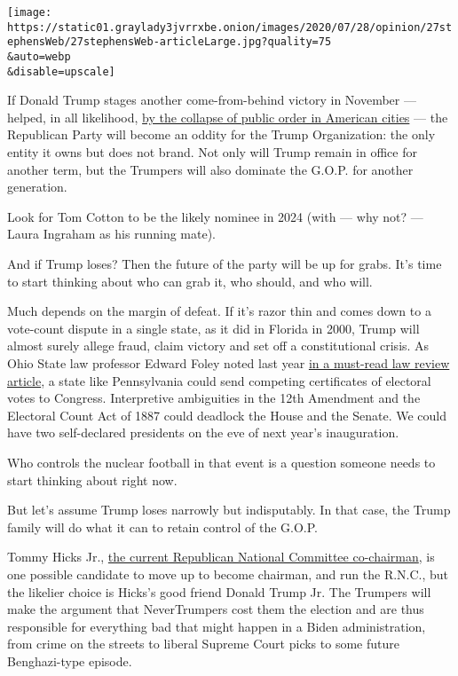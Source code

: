 \texttt{[image: https://static01.graylady3jvrrxbe.onion/images/2020/07/28/opinion/27stephensWeb/27stephensWeb-articleLarge.jpg?quality=75\\\&auto=webp\\\&disable=upscale]}

If Donald Trump stages another come-from-behind victory in November ---
helped, in all likelihood,
\href{https://www.nytimes3xbfgragh.onion/2020/07/26/us/protests-portland-seattle-trump.html?action=click\&module=Top\%20Stories\&pgtype=Homepage}{by
the collapse of public order in American cities} --- the Republican
Party will become an oddity for the Trump Organization: the only entity
it owns but does not brand. Not only will Trump remain in office for
another term, but the Trumpers will also dominate the G.O.P. for another
generation.

Look for Tom Cotton to be the likely nominee in 2024 (with --- why not?
--- Laura Ingraham as his running mate).

And if Trump loses? Then the future of the party will be up for grabs.
It's time to start thinking about who can grab it, who should, and who
will.

Much depends on the margin of defeat. If it's razor thin and comes down
to a vote-count dispute in a single state, as it did in Florida in 2000,
Trump will almost surely allege fraud, claim victory and set off a
constitutional crisis. As Ohio State law professor Edward Foley noted
last year
\href{https://lawecommons.luc.edu/cgi/viewcontent.cgi?article=2719\&context=luclj}{in
a must-read law review article}, a state like Pennsylvania could send
competing certificates of electoral votes to Congress. Interpretive
ambiguities in the 12th Amendment and the Electoral Count Act of 1887
could deadlock the House and the Senate. We could have two self-declared
presidents on the eve of next year's inauguration.

Who controls the nuclear football in that event is a question someone
needs to start thinking about right now.

But let's assume Trump loses narrowly but indisputably. In that case,
the Trump family will do what it can to retain control of the G.O.P.

Tommy Hicks Jr.,
\href{https://www.buzzfeednews.com/article/tariniparti/trump-tommy-hicks-rnc-co-chair}{the
current Republican National Committee co-chairman}, is one possible
candidate to move up to become chairman, and run the R.N.C., but the
likelier choice is Hicks's good friend Donald Trump Jr. The Trumpers
will make the argument that NeverTrumpers cost them the election and are
thus responsible for everything bad that might happen in a Biden
administration, from crime on the streets to liberal Supreme Court picks
to some future Benghazi-type episode.

